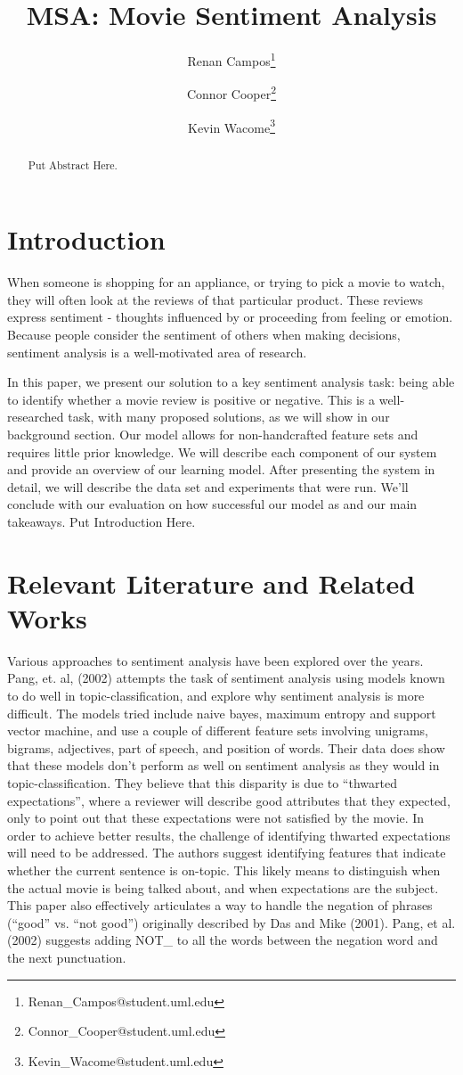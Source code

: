 \documentclass[11pt,letterpaper]{article}
\title{MSA: Movie Sentiment Analysis}
\author[1]{Renan Campos\thanks{Renan\_Campos@student.uml.edu}}
\author[1]{Connor Cooper\thanks{Connor\_Cooper@student.uml.edu}}
\author[1]{Kevin Wacome\thanks{Kevin\_Wacome@student.uml.edu}}
\affil[1]{Department of Computer Science, University of Massachusetts Lowell}
\begin{document}
\maketitle
\begin{abstract}
Put Abstract Here.
\end{abstract}

\section{Introduction}

When someone is shopping for an appliance, or trying to pick a movie to watch, they will often look at the reviews of that particular product. These reviews express sentiment - thoughts influenced by or proceeding from feeling or emotion. Because people consider the sentiment of others when making decisions, sentiment analysis is a well-motivated area of research.

In this paper, we present our solution to a key sentiment analysis task: being able to identify whether a movie review is positive or negative. This is a well-researched task, with many proposed solutions, as we will show in our background section. Our model allows for non-handcrafted feature sets and requires little prior knowledge. We will describe each component of our system and provide an overview of our learning model. After presenting the system in detail, we will describe the data set and experiments that were run. We’ll conclude with our evaluation on how successful our model as and our main takeaways.
Put Introduction Here.


\section{Relevant Literature and Related Works}

Various approaches to sentiment analysis have been explored over the years. Pang, et. al, (2002) attempts the task of sentiment analysis using models known to do well in topic-classification, and explore why sentiment analysis is more difficult. The models tried include naive bayes, maximum entropy and support vector machine, and use a couple of different feature sets involving unigrams, bigrams, adjectives, part of speech, and position of words. Their data does show that these models don’t perform as well on sentiment analysis as they would in topic-classification. They believe that this disparity is due to “thwarted expectations”, where a reviewer will describe good attributes that they expected, only to point out that these expectations were not satisfied by the movie. In order to achieve better results, the challenge of identifying  thwarted expectations will need to be addressed. The authors suggest identifying features that indicate whether the current sentence is on-topic. This likely means to distinguish when the actual movie is being talked about, and when expectations are the subject. This paper also effectively articulates a way to handle the negation of phrases (“good” vs. “not good”) originally described by Das and Mike (2001). Pang, et al. (2002) suggests adding NOT\_ to all the words between the negation word and the next punctuation.   
\end{document}
